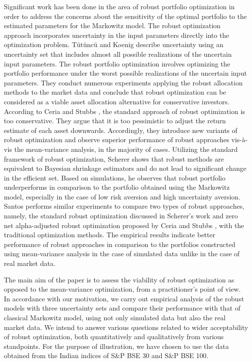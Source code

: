 \documentclass[12pt]{article}
\numberwithin{equation}{section}
\begin{document}
Significant work has been done in the area of robust portfolio optimization in order to address the concerns about the sensitivity of the optimal portfolio to the estimated parameters for the Markowitz model. The robust optimization approach incorporates uncertainty in the input parameters directly into the optimization problem. T{\"u}t{\"u}nc{\"u} and Koenig \cite{Tutuncu04} describe uncertainty using an uncertainty set that includes almost all possible realizations of the uncertain input parameters. The robust portfolio optimization involves optimizing the portfolio performance under the worst possible realizations of the uncertain input parameters. They conduct numerous experiments applying the robust allocation methods to the market data and conclude that robust optimization can be considered as a viable asset allocation alternative for conservative investors. According to Ceria and Stubbs \cite{Ceria06}, the standard approach of robust optimization is too conservative. They argue that it is too pessimistic to adjust the return estimate of each asset downwards. Accordingly, they introduce new variants of robust optimization and observe superior performance of robust approaches vis-\`a-vis the mean-variance analysis, in the majority of cases. Utilizing the standard framework of robust optimization, Scherer \cite{Scherer07} shows that robust methods are equivalent to Bayesian shrinkage estimators and do not lead to significant change in the efficient set. Based on simulations, he observes that robust portfolio underperforms in comparison to the portfolio obtained using the Markowitz model, especially in the case of low risk aversion and high uncertainty aversion. Santos \cite{Santos10} performs similar experiments to compare two types of robust approaches, namely, the standard robust optimization discussed in Scherer's work \cite{Scherer07} and zero net alpha-adjusted robust optimization proposed by Ceria and Stubbs \cite{Ceria06}, with the traditional optimization methods. The empirical results indicate better performance of robust approaches in comparison to the portfolios constructed using mean-variance analysis in the case of simulated data unlike in the case of real market data.

The main aim of the paper is to assess the viability of robust optimization as opposed to the mean-variance optimization, from a practitioner's point of view. In accordance with our motivation, we carry out empirical analysis of the robust models with three uncertainty sets and compare their performance with that of classical Markowitz model, using not only simulated data but also the real market data. We intend to answer various questions related to wider acceptability of robust optimization, both quantitatively and qualitatively from various standpoints. For the purpose of illustration, we have chosen to use the data obtained from the Indian indices of S\&P BSE 30 and S\&P BSE 100.
\end{document}
